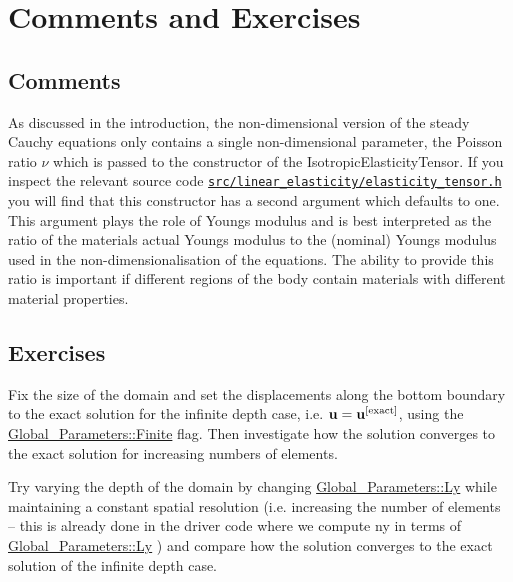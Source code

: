  

\hypertarget{index_comments}{}\section{Comments and Exercises}\label{index_comments}
\hypertarget{index_nondim}{}\subsection{Comments}\label{index_nondim}
As discussed in the introduction, the non-\/dimensional version of the steady Cauchy equations only contains a single non-\/dimensional parameter, the Poisson ratio $ \nu $ which is passed to the constructor of the {\ttfamily Isotropic\+Elasticity\+Tensor}. If you inspect the relevant source code \href{../../../../src/linear_elasticity/elasticity_tensor.h}{\tt src/linear\+\_\+elasticity/elasticity\+\_\+tensor.\+h} you will find that this constructor has a second argument which defaults to one. This argument plays the role of Young\textquotesingle{}s modulus and is best interpreted as the ratio of the material\textquotesingle{}s actual Young\textquotesingle{}s modulus to the (nominal) Young\textquotesingle{}s modulus used in the non-\/dimensionalisation of the equations. The ability to provide this ratio is important if different regions of the body contain materials with different material properties.\hypertarget{index_exercises}{}\subsection{Exercises}\label{index_exercises}

\begin{DoxyEnumerate}
\item Fix the size of the domain and set the displacements along the bottom boundary to the exact solution for the infinite depth case, i.\+e. $ {\bf u} = {\bf u}^{[\mathrm{exact}]} $, using the {\ttfamily \hyperlink{namespaceGlobal__Parameters_a3a5d4759509036a2650d5efde8e15d56}{Global\+\_\+\+Parameters\+::\+Finite}} flag. Then investigate how the solution converges to the exact solution for increasing numbers of elements.
\item Try varying the depth of the domain by changing {\ttfamily \hyperlink{namespaceGlobal__Parameters_a25a31b2de3f05ac457b62fc9fa999872}{Global\+\_\+\+Parameters\+::\+Ly}} while maintaining a constant spatial resolution (i.\+e. increasing the number of elements -- this is already done in the driver code where we compute {\ttfamily ny} in terms of {\ttfamily \hyperlink{namespaceGlobal__Parameters_a25a31b2de3f05ac457b62fc9fa999872}{Global\+\_\+\+Parameters\+::\+Ly}} ) and compare how the solution converges to the exact solution of the infinite depth case.
\end{DoxyEnumerate}



